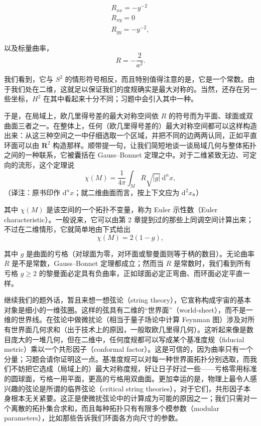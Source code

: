 \begin{gather*}
R_{xx} = -y^{-2}\\
R_{xy} = 0\\
R_{yy} = -y^{-2},
\tag{3.197}
\end{gather*}

以及标量曲率，
\begin{equation*}
R = -\frac{2}{a^{2}}.
\tag{3.198}
\end{equation*}

我们看到，它与 $S^{2}$ 的情形符号相反，而且特别值得注意的是，它是一个常数。由于我们处在二维，这就足以保证我们的度规确实是最大对称的。当然，还存在另一些坐标，$H^{2}$ 在其中看起来十分不同；习题中会引入其中一种。

于是，在局域上，欧几里得号差的最大对称空间依 $R$ 的符号而为平面、球面或双曲面三者之一。在整体上，任何（欧几里得号差的）最大对称空间都可以这样构造出来：从这三种空间之一中仔细选取一个区域，并把不同的边两两认同，正如平直环面可以由 $\mathbf{R}^{2}$ 构造那样。顺带提一句，让我们简短地谈一谈局域几何与整体拓扑之间的一种联系，它被囊括在 Gauss–Bonnet 定理之中。对于二维紧致无边、可定向的流形，这个定理说
\begin{equation*}
\chi(M) = \frac{1}{4\pi}\int_{M} R\sqrt{|g|}\,\mathrm{d}^{n}x,
\tag{3.199}
\end{equation*}
（译注：原书印作 $\mathrm{d}^{n}x$；就二维曲面而言，按上下文应为 $\mathrm{d}^{2}x$。）

其中 $\chi(M)$ 是该空间的一个拓扑不变量，称为 Euler 示性数（Euler characteristic）。一般说来，它可以由第 2 章提到过的那些上同调空间计算出来；不过在二维情形，它就简单地由下式给出
\begin{equation*}
\chi(M) = 2(1 - g),
\tag{3.200}
\end{equation*}

其中 $g$ 是曲面的亏格（对球面为零，对环面或黎曼面则等于柄的数目）。无论曲率 $R$ 是不是常数，Gauss–Bonnet 定理都成立；然而当 $R$ 是常数时，我们看到所有亏格 $g \geq 2$ 的黎曼面必定具有负曲率，正如球面必定正弯曲、而环面必定平直一样。

继续我们的题外话，暂且来想一想弦论（string theory），它宣称构成宇宙的基本对象是细小的一维弦圈。这样的弦具有二维的“世界面”（world-sheet），而不是一维的世界线。在弦论中做微扰论（相当于量子场论中计算 Feynman 图）涉及对所有世界面几何求和（出于技术上的原因，一般取欧几里得几何）。这听起来像是数目庞大的一堆几何，但在二维中，任何度规都可以写成某个基准度规（fiducial metric）乘以一个共形因子（conformal factor）。这是可信的，因为曲率只有一个分量；习题会请你证明这一点。基准度规可以对每一种世界面拓扑分别选取，而我们不妨把它选成（局域上的）最大对称度规，好让日子好过一些——亏格零用标准的圆球面，亏格一用平面，更高的亏格用双曲面。更加幸运的是，物理上最令人感兴趣的弦论是所谓的临界弦论（critical string theories），对于它们，共形因子本身根本无关紧要。这正是使微扰弦论中的计算成为可能的原因之一；我们只需对一个离散的拓扑集合求和，而且每种拓扑只有有限多个模参数（modular parameters），比如那些告诉我们环面各方向尺寸的参数。

